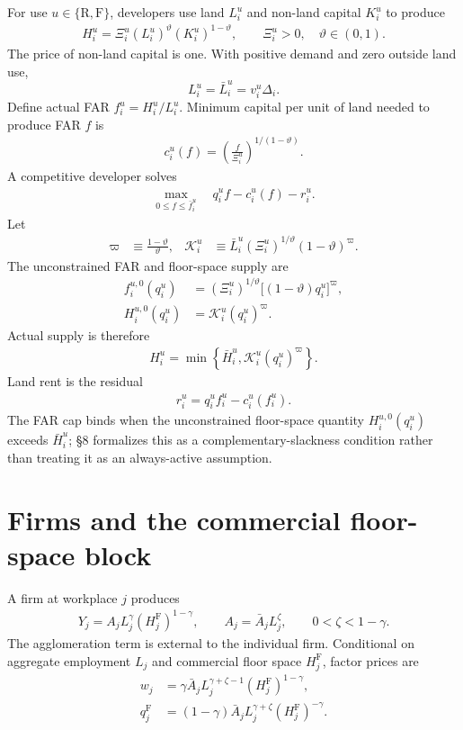 \documentclass[12pt,a4paper]{article}
\newcommand{\R}{\mathrm{R}}
\newcommand{\F}{\mathrm{F}}
\newcommand{\1}{\mathbb 1}
\begin{document}
For use $u\in\{\R,\F\}$, developers use land $L_i^u$ and non-land capital $K_i^u$ to produce
\begin{align}
H_i^u
=
\Xi_i^u(L_i^u)^{\vartheta}(K_i^u)^{1-\vartheta},
\qquad
\Xi_i^u>0,
\quad
\vartheta\in(0,1).
\label{eq:construction}
\end{align}
The price of non-land capital is one. With positive demand and zero outside land use,
\[
L_i^u=\bar L_i^u=v_i^u\Delta_i.
\]
Define actual FAR $f_i^u=H_i^u/L_i^u$. Minimum capital per unit of land needed to produce FAR $f$ is
\begin{align}
c_i^u(f)
=
\left(\frac{f}{\Xi_i^u}\right)^{1/(1-\vartheta)}.
\label{eq:construction-cost}
\end{align}
A competitive developer solves
\begin{align}
\max_{0\leq f\leq\bar f_i^u}
\quad
q_i^u f-c_i^u(f)-r_i^u.
\label{eq:developer-problem}
\end{align}
Let
\begin{align}
\varpi
&\equiv\frac{1-\vartheta}{\vartheta},
&
\mathcal K_i^u
&\equiv
\bar L_i^u(\Xi_i^u)^{1/\vartheta}(1-\vartheta)^{\varpi}.
\label{eq:supply-constants}
\end{align}
The unconstrained FAR and floor-space supply are
\begin{align}
f_i^{u,0}(q_i^u)
&=
(\Xi_i^u)^{1/\vartheta}
\bigl[(1-\vartheta)q_i^u\bigr]^{\varpi},
\label{eq:far-unconstrained}\\
H_i^{u,0}(q_i^u)
&=
\mathcal K_i^u(q_i^u)^{\varpi}.
\label{eq:supply-unconstrained}
\end{align}
Actual supply is therefore
\begin{align}
H_i^u
=
\min\left\{
\bar H_i^u,
\mathcal K_i^u(q_i^u)^{\varpi}
\right\}.
\label{eq:floorspace-supply}
\end{align}
Land rent is the residual
\begin{align}
r_i^u=q_i^uf_i^u-c_i^u(f_i^u).
\label{eq:land-rent}
\end{align}
The FAR cap binds when the unconstrained floor-space quantity $H_i^{u,0}(q_i^u)$ exceeds $\bar H_i^u$; \S8 formalizes this as a complementary-slackness condition rather than treating it as an always-active assumption.

\section{Firms and the commercial floor-space block}

A firm at workplace $j$ produces
\begin{align}
Y_j=A_jL_j^{\gamma}(H_j^{\F})^{1-\gamma},
\qquad
A_j=\bar A_jL_j^{\zeta},
\qquad
0<\zeta<1-\gamma.
\label{eq:firm-production}
\end{align}
The agglomeration term is external to the individual firm. Conditional on aggregate employment $L_j$ and commercial floor space $H_j^{\F}$, factor prices are
\begin{align}
w_j
&=
\gamma\bar A_jL_j^{\gamma+\zeta-1}
(H_j^{\F})^{1-\gamma},
\label{eq:wage}\\
q_j^{\F}
&=
(1-\gamma)\bar A_jL_j^{\gamma+\zeta}
(H_j^{\F})^{-\gamma}.
\label{eq:commercial-rent}
\end{align}
\end{document}
